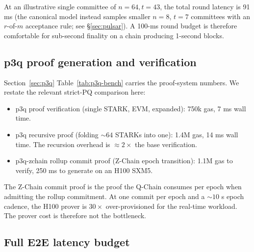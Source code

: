 At an illustrative single committee of $n=64, t=43$, the total round
latency is 91 ms (the canonical model instead samples smaller $n{=}8$,
$t{=}7$ committees with an $r$-of-$m$ acceptance rule; see
\S\ref{sec:pulsar}). A 100-ms round budget is therefore comfortable for
sub-second finality on a chain producing 1-second blocks.

\subsection{p3q proof generation and verification}

Section~\ref{sec:p3q} Table~\ref{tab:p3q-bench} carries the proof-system
numbers. We restate the relevant strict-PQ comparison here:

\begin{itemize}[leftmargin=2em,nosep]
  \item p3q proof verification (single STARK, EVM, expanded):
    750k gas, 7 ms wall time.
  \item p3q recursive proof (folding $\sim 64$ STARKs into one):
    1.4M gas, 14 ms wall time. The recursion overhead is $\approx 2\times$
    the base verification.
  \item p3q-zchain rollup commit proof (Z-Chain epoch transition):
    1.1M gas to verify, 250 ms to generate on an H100 SXM5.
\end{itemize}

The Z-Chain commit proof is the proof the Q-Chain consumes per epoch when
admitting the rollup commitment. At one commit per epoch and a $\sim 10$ s
epoch cadence, the H100 prover is $30\times$ over-provisioned for the
real-time workload. The prover cost is therefore not the bottleneck.

\subsection{Full E2E latency budget}

